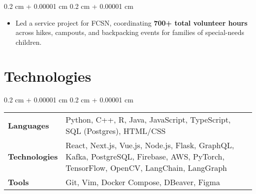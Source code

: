\documentclass[10pt, letterpaper]{article}
\newenvironment{highlights}{
    \begin{itemize}[
        topsep=0.10 cm,
        parsep=0.10 cm,
        partopsep=0pt,
        itemsep=0pt,
        leftmargin=0.4 cm + 10pt
    ]
}{
    \end{itemize}
} %
\newenvironment{onecolentry}{
    \begin{adjustwidth}{
        0.2 cm + 0.00001 cm
    }{
        0.2 cm + 0.00001 cm
    }
}{
    \end{adjustwidth}
} %
\begin{document}
        \vspace{0.10 cm}
        \begin{onecolentry}
            \begin{highlights}
                \item Led a service project for FCSN, coordinating \textbf{700+ total volunteer hours} across hikes, campouts, and backpacking events for families of special-needs children.
            \end{highlights}
        \end{onecolentry}


    \section{Technologies}
    
        \begin{onecolentry}
            \begin{tabularx}{\textwidth}{@{}p{2.15cm}Y@{}}
                \textbf{Languages} & Python, C++, R, Java, JavaScript, TypeScript, SQL (Postgres), HTML/CSS \\[0.1cm]
                \textbf{Technologies} & React, Next.js, Vue.js, Node.js, Flask, GraphQL, Kafka, PostgreSQL, Firebase, AWS, PyTorch, TensorFlow, OpenCV, LangChain, LangGraph \\[0.5cm]
                \textbf{Tools} & Git, Vim, Docker Compose, DBeaver, Figma
            \end{tabularx}
        \end{onecolentry}
\end{document}
